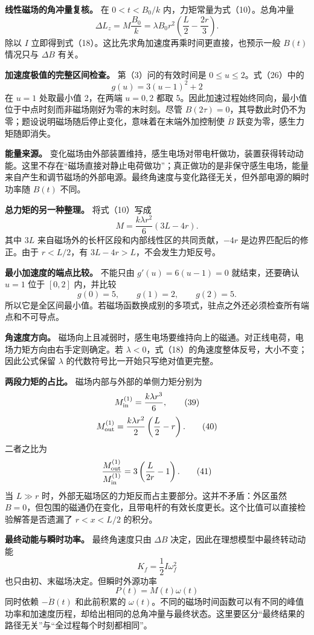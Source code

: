 \documentclass[12pt,a4paper,UTF8]{ctexart}
\begin{document}
\textbf{线性磁场的角冲量复核。} 在 \(0<t<B_0/k\)
内，力矩常量为式（10）。总角冲量 \[
\Delta L_z=M\frac{B_0}{k}
=\lambda B_0r^2\left(\frac L2-\frac{2r}{3}\right). \tag{35}
\] 除以 \(I\)
立即得到式（18）。这比先求角加速度再乘时间更直接，也预示一般 \(B(t)\)
情况只与 \(\Delta B\) 有关。

\textbf{加速度极值的完整区间检查。} 第（3）问的有效时间是
\(0\le u\le2\)。式（26）中的 \[
g(u)=3(u-1)^2+2 \tag{36}
\] 在 \(u=1\) 处取最小值 2，在两端 \(u=0,2\) 都取
5。因此加速过程始终同向，最小值位于中点时刻而非磁场刚好为零的末时刻。尽管
\(B(2\tau)=0\)，其导数此时仍不为零；题设说明磁场随后停止变化，意味着在末端外加控制使
\(\dot B\) 跃变为零，感生力矩随即消失。

\textbf{能量来源。}
变化磁场由外部装置维持，感生电场对带电杆做功，装置获得转动动能。这里不存在``磁场直接对静止电荷做功''；真正做功的是非保守感生电场，能量来自产生和调节磁场的外部电源。最终角速度与变化路径无关，但外部电源的瞬时功率随
\(B(t)\) 不同。

\textbf{总力矩的另一种整理。} 将式（10）写成 \[
M=\frac{k\lambda r^2}{6}(3L-4r). \tag{37}
\] 其中 \(3L\) 来自磁场外的长杆区段和内部线性区的共同贡献，\(-4r\)
是边界匹配后的修正。由于 \(r<L/2\)，有 \(3L-4r>L\)，不会发生力矩反号。

\textbf{最小加速度的端点比较。} 不能只由 \(g'(u)=6(u-1)=0\)
就结束，还要确认 \(u=1\) 位于 \([0,2]\) 内，并比较 \[
g(0)=5,
\qquad g(1)=2,
\qquad g(2)=5. \tag{38}
\]
所以它是全区间最小值。若磁场函数换成别的多项式，驻点之外还必须检查所有端点和不可导点。

\textbf{角速度方向。}
磁场向上且减弱时，感生电场要维持向上的磁通。对正线电荷，电场力矩方向由右手定则确定。若
\(\lambda<0\)，式（18）的角速度整体反号，大小不变；因此公式保留
\(\lambda\) 的代数符号比一开始只写绝对值更完整。

\textbf{两段力矩的占比。} 磁场内部与外部的单侧力矩分别为 \[
M_{\rm in}^{(1)}
=\frac{k\lambda r^3}{6}, \tag{39}
\] \[
M_{\rm out}^{(1)}
=\frac{k\lambda r^2}{2}\left(\frac L2-r\right). \tag{40}
\] 二者之比为 \[
\frac{M_{\rm out}^{(1)}}{M_{\rm in}^{(1)}}
=3\left(\frac{L}{2r}-1\right). \tag{41}
\] 当 \(L\gg r\)
时，外部无磁场区的力矩反而占主要部分。这并不矛盾：外区虽然
\(B=0\)，但包围的磁通仍在变化，且带电杆的有效长度更长。这个比值可以直接检验解答是否遗漏了
\(r<x<L/2\) 的积分。

\textbf{最终动能与瞬时功率。} 最终角速度只由 \(\Delta B\)
决定，因此在理想模型中最终转动动能 \[
K_f=\frac12I\omega_f^2 \tag{42}
\] 也只由初、末磁场决定。但瞬时外源功率 \[
P(t)=M(t)\omega(t) \tag{43}
\] 同时依赖 \(-\dot B(t)\) 和此前积累的
\(\omega(t)\)。不同的磁场时间函数可以有不同的峰值功率和加速度历程，却给出相同的总角冲量与最终状态。这里要区分``最终结果的路径无关''与``全过程每个时刻都相同''。
\end{document}
